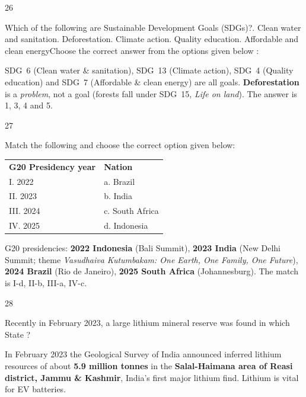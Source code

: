 \begin{question}{26}
{Which of the following are Sustainable Development Goals (SDGs)?. Clean water and sanitation. Deforestation. Climate action. Quality education. Affordable and clean energy\newline Choose the correct answer from the options given below :\par}
\begin{explain}
SDG~6 (Clean water \& sanitation), SDG~13 (Climate action), SDG~4 (Quality education) and SDG~7 (Affordable \& clean energy) are all goals. \textbf{Deforestation} is a \emph{problem}, not a goal (forests fall under SDG~15, \emph{Life on land}). The answer is 1, 3, 4 and 5.
\end{explain}
\end{question}

\begin{question}{27}
{Match the following and choose the correct option given below:\\[2pt]
\begin{tabular}{@{}ll@{}}
\textbf{G20 Presidency year} & \textbf{Nation}\\
I. 2022 & a. Brazil\\
II. 2023 & b. India\\
III. 2024 & c. South Africa\\
IV. 2025 & d. Indonesia\\
\end{tabular}\par}
\begin{explain}
G20 presidencies: \textbf{2022 Indonesia} (Bali Summit), \textbf{2023 India} (New Delhi Summit; theme \emph{Vasudhaiva Kutumbakam: One Earth, One Family, One Future}), \textbf{2024 Brazil} (Rio de Janeiro), \textbf{2025 South Africa} (Johannesburg). The match is I-d, II-b, III-a, IV-c.
\end{explain}
\end{question}

\begin{question}{28}
{Recently in February 2023, a large lithium mineral reserve was found in which State ?\par}
\begin{explain}
In February 2023 the Geological Survey of India announced inferred lithium resources of about \textbf{5.9 million tonnes} in the \textbf{Salal-Haimana area of Reasi district, Jammu \& Kashmir}, India's first major lithium find. Lithium is vital for EV batteries.
\end{explain}
\end{question}

